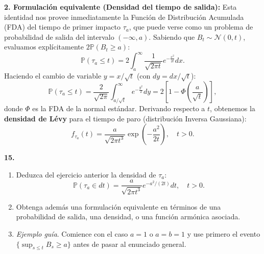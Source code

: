 \documentclass[11pt, letterpaper]{article}
\begin{document}
\begin{solucion}
    \textbf{2. Formulación equivalente (Densidad del tiempo de salida):}
    Esta identidad nos provee inmediatamente la Función de Distribución Acumulada (FDA) del tiempo de primer impacto $\tau_a$, que puede verse como un problema de probabilidad de salida del intervalo $(-\infty, a)$.
    Sabiendo que $B_t \sim \mathcal{N}(0, t)$, evaluamos explícitamente $2\mathbb{P}(B_t \ge a)$:
    \[ \mathbb{P}(\tau_a \le t) = 2 \int_a^\infty \frac{1}{\sqrt{2\pi t}} e^{-\frac{x^2}{2t}} dx. \]
    Haciendo el cambio de variable $y = x / \sqrt{t}$ (con $dy = dx / \sqrt{t}$):
    \[ \mathbb{P}(\tau_a \le t) = \frac{2}{\sqrt{2\pi}} \int_{a/\sqrt{t}}^\infty e^{-\frac{y^2}{2}} dy = 2\left[1 - \Phi\left(\frac{a}{\sqrt{t}}\right)\right], \]
    donde $\Phi$ es la FDA de la normal estándar. Derivando respecto a $t$, obtenemos la \textbf{densidad de Lévy} para el tiempo de paro (distribución Inversa Gaussiana):
    \[ f_{\tau_a}(t) = \frac{a}{\sqrt{2\pi t^3}} \exp\left( -\frac{a^2}{2t} \right), \quad t > 0. \]
\end{solucion}

\newpage


\begin{ejercicio}
    \textbf{15.} 
    \begin{enumerate}
        \item Deduzca del ejercicio anterior la densidad de $\tau_a$:
        \[ \mathbb{P}(\tau_a \in dt) = \frac{a}{\sqrt{2\pi t^3}} e^{-a^2/(2t)} dt, \quad t > 0. \]
        \item Obtenga además una formulación equivalente en términos de una probabilidad de salida, una densidad, o una función armónica asociada.
        \item \textit{Ejemplo guía}. Comience con el caso $a = 1$ o $a = b = 1$ y use primero el evento $\{\sup_{s \le t} B_s \ge a\}$ antes de pasar al enunciado general.
    \end{enumerate}
\end{ejercicio}

\vspace{5mm}
\end{document}
